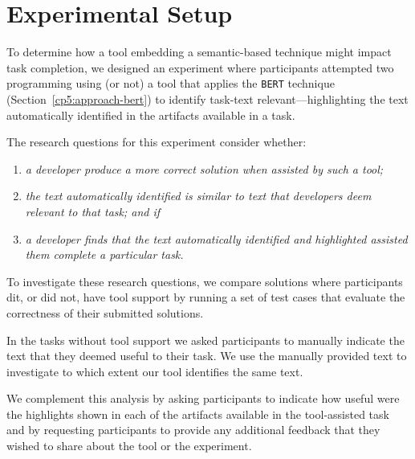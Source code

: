 \clearpage

\section{Experimental Setup}
\label{cp6:procedures}





To determine how a tool embedding a semantic-based technique might impact task completion, we designed an experiment where participants attempted two programming
 using (or not) a tool that applies the \texttt{BERT} technique (Section~\ref{cp5:approach-bert})
 to  identify task-text relevant---highlighting  the text automatically identified  in the artifacts available in a task. 


The research questions for this experiment consider whether:



\begin{enumerate}
    \item \textit{a developer produce a more correct solution when assisted by such a tool;}
    \item \textit{the text automatically identified is similar to text that developers deem relevant to that task; and if}
    \item \textit{a developer finds that the text automatically identified and highlighted assisted them complete a particular task.}
\end{enumerate}



To investigate these research questions, 
we compare solutions where participants dit, or did not, have tool support by
running a set of test cases that evaluate the correctness of their submitted solutions.


In the tasks without tool support we asked participants to manually indicate the text that they deemed useful to their task.
We use the manually provided text to investigate to which extent our tool identifies the same text.


We complement this analysis by asking participants to indicate how useful were the highlights shown in each of the artifacts available in the tool-assisted task
and by requesting participants to provide any additional feedback that they wished to share about the tool or the experiment.







